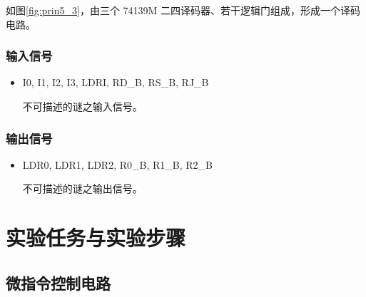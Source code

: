 如图\ref{fig:prin5_3}，由三个 74139M 二四译码器、若干逻辑门组成，形成一个译码电路。

\subsubsection{输入信号}

\begin{itemize}
    \item I0, I1, I2, I3, LDRI, RD\_B, RS\_B, RJ\_B
    
    不可描述的谜之输入信号。
    
\end{itemize} 

\subsubsection{输出信号}

\begin{itemize}
    \item LDR0, LDR1, LDR2, R0\_B, R1\_B, R2\_B
    
    不可描述的谜之输出信号。
    
\end{itemize}

\section{实验任务与实验步骤}

\subsection{微指令控制电路}

